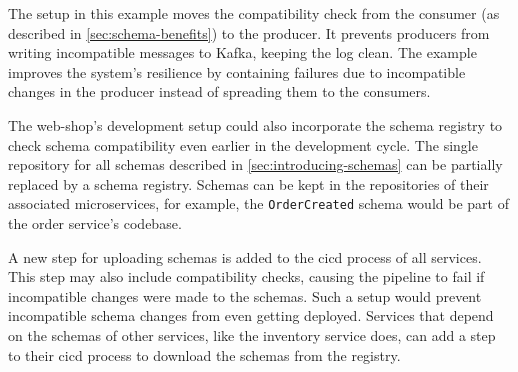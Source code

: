 The setup in this example moves the compatibility check from the consumer (as described in \ref{sec:schema-benefits}) to the producer.
It prevents producers from writing incompatible messages to Kafka, keeping the log clean.
The example improves the system's resilience by containing failures due to incompatible changes in the producer instead of spreading them to the consumers.

The web-shop's development setup could also incorporate the schema registry to check schema compatibility even earlier in the development cycle.
The single repository for all schemas described in \ref{sec:introducing-schemas} can be partially replaced by a schema registry.
Schemas can be kept in the repositories of their associated microservices, for example, the \texttt{OrderCreated} schema would be part of the order service's codebase.

A new step for uploading schemas is added to the \gls{cicd} process of all services.
This step may also include compatibility checks, causing the pipeline to fail if incompatible changes were made to the schemas.
Such a setup would prevent incompatible schema changes from even getting deployed.
Services that depend on the schemas of other services, like the inventory service does, can add a step to their \gls{cicd} process to download the schemas from the registry.
